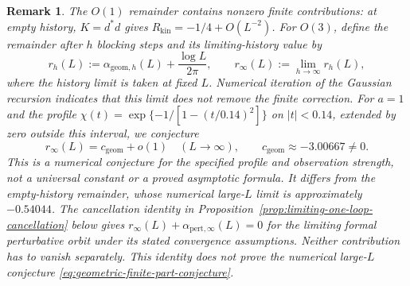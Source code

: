 \documentclass[11pt]{article}
\numberwithin{equation}{section}
\newtheorem{remark}[theorem]{Remark}
\theoremstyle{definition}
\theoremstyle{plain}
\begin{document}
\begin{remark}
\label{rem:geometric-finite-part}
The $O(1)$ remainder contains nonzero finite contributions:
at empty history, $K=d^*d$ gives
$R_{\mathrm{kin}}=-1/4+O(L^{-2})$.
For $O(3)$, define the remainder after $h$ blocking steps and
its limiting-history value by
\begin{equation}
 r_h(L):=\alpha_{\mathrm{geom},h}(L)+\frac{\log L}{2\pi},
 \qquad r_\infty(L):=\lim_{h\to\infty}r_h(L),
 \label{eq:geometric-history-remainder}
\end{equation}
where the history limit is taken at fixed $L$.
Numerical iteration of the Gaussian recursion indicates that
this limit does not remove the finite correction.
For $a=1$ and the profile
$\chi(t)=\exp\{-1/[1-(t/0.14)^2]\}$ on $|t|<0.14$,
extended by zero outside this interval, we conjecture
\begin{equation}
 r_\infty(L)=c_{\mathrm{geom}}+o(1)
 \quad (L\to\infty),\qquad
 c_{\mathrm{geom}}\approx-3.00667\ne0.
 \label{eq:geometric-finite-part-conjecture}
\end{equation}
This is a numerical conjecture for the specified profile and
observation strength, not a universal constant or a proved
asymptotic formula.
It differs from the empty-history remainder, whose numerical
large-$L$ limit is approximately $-0.54044$.
The cancellation identity in
Proposition~\ref{prop:limiting-one-loop-cancellation} below gives
$r_\infty(L)+\alpha_{\mathrm{pert},\infty}(L)=0$
for the limiting formal perturbative orbit under its stated
convergence assumptions.  Neither contribution has to vanish
separately.  This identity does not prove the numerical
large-$L$ conjecture \eqref{eq:geometric-finite-part-conjecture}.
\end{remark}
\end{document}
